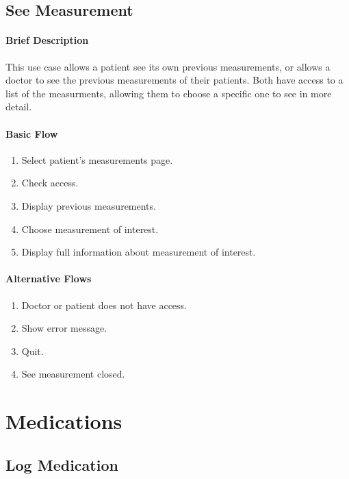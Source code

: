 \documentclass{report}
\begin{document}
\clearpage
\subsection{See Measurement}

\paragraph{Brief Description}
This use case allows a patient see its own previous measurements, or allows a doctor to see the previous measurements of their patients.
Both have access to a list of the measurments, allowing them to choose a specific one to see in more detail.

\begin{multicols}{2}
    \paragraph{Basic Flow}
    \begin{enumerate}
        \item Select patient's measurements page.
        \item Check access.
        \item Display previous measurements.
        \item Choose measurement of interest.
        \item Display full information about measurement of interest.
    \end{enumerate}
    \columnbreak
    
    \paragraph{Alternative Flows}
    \begin{enumerate}[label=A\arabic*.]
        \item Doctor or patient does not have access.
        \item Show error message.
        \item Quit.
        \item See measurement closed.
    \end{enumerate}
\end{multicols}

\vspace{1em}
\section{Medications}
\subsection{Log Medication}
\end{document}
